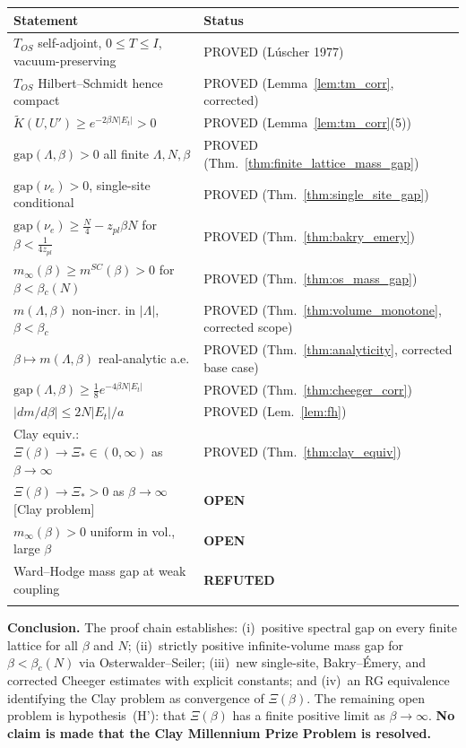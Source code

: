\begin{center}
\begin{tabular}{p{9.2cm}|l}
\hline{}
\textbf{Statement} & \textbf{Status}\\
\hline{}
$T_{OS}$ self-adjoint, $0\le{}T\le{}I$, vacuum-preserving & PROVED (L\'uscher 1977)\\
$T_{OS}$ Hilbert--Schmidt hence compact & PROVED (Lemma~\ref{lem:tm_corr}, corrected)\\
$\tilde{K}(U,U')\ge{} e^{-2\beta{} N|E_t|}>0$ & PROVED (Lemma~\ref{lem:tm_corr}(5))\\
$\mathrm{gap}(\Lambda{},\beta{})>0$ all finite $\Lambda{}, N, \beta{}$ & PROVED (Thm.~\ref{thm:finite_lattice_mass_gap})\\
$\mathrm{gap}(\nu{}_e)>0$, single-site conditional & PROVED (Thm.~\ref{thm:single_site_gap})\\
$\mathrm{gap}(\nu{}_e)\ge{}\frac{N}{4}-z_{pl}\beta{} N$ for $\beta{}<\frac{1}{4z_{pl}}$ & PROVED (Thm.~\ref{thm:bakry_emery})\\
$m_{\infty{}}(\beta{})\ge{} m^{SC}(\beta{})>0$ for $\beta{}<\beta{}_c(N)$ & PROVED (Thm.~\ref{thm:os_mass_gap})\\
$m(\Lambda{},\beta{})$ non-incr. in $|\Lambda{}|$, $\beta{}<\beta{}_c$ & PROVED (Thm.~\ref{thm:volume_monotone}, corrected scope)\\
$\beta{}\mapsto{}m(\Lambda{},\beta{})$ real-analytic a.e. & PROVED (Thm.~\ref{thm:analyticity}, corrected base case)\\
$\mathrm{gap}(\Lambda{},\beta{})\ge{}\tfrac{1}{8}e^{-4\beta{} N|E_t|}$ & PROVED (Thm.~\ref{thm:cheeger_corr})\\
$|dm/d\beta{}|\le{} 2N|E_t|/a$ & PROVED (Lem.~\ref{lem:fh})\\
Clay equiv.: $\Xi(\beta) \to \Xi_* \in (0,\infty)$ as $\beta\to\infty$ & PROVED (Thm.~\ref{thm:clay_equiv})\\
\hline{}
$\Xi{}(\beta{})\to{}\Xi{}_*>0$ as $\beta{}\to{}\infty{}$ [Clay problem] & \textbf{OPEN}\\
$m_{\infty{}}(\beta{})>0$ uniform in vol., large $\beta{}$ & \textbf{OPEN}\\
Ward--Hodge mass gap at weak coupling & \textbf{REFUTED}\\
\hline{}
\end{tabular}
\end{center}

\medskip{}
\noindent{}\textbf{Conclusion.}
The proof chain establishes: (i)~positive spectral gap on every finite lattice for all $\beta{}$ and $N$;
(ii)~strictly positive infinite-volume mass gap for $\beta{}<\beta{}_c(N)$ via Osterwalder--Seiler;
(iii)~new single-site, Bakry--\'Emery, and corrected Cheeger estimates with explicit constants;
and (iv)~an RG equivalence identifying the Clay problem as convergence of $\Xi{}(\beta{})$.
The remaining open problem is hypothesis~(H'): that $\Xi{}(\beta{})$ has a finite positive limit as $\beta{}\to{}\infty{}$.
\textbf{No claim is made that the Clay Millennium Prize Problem is resolved.}

\endinput{}
